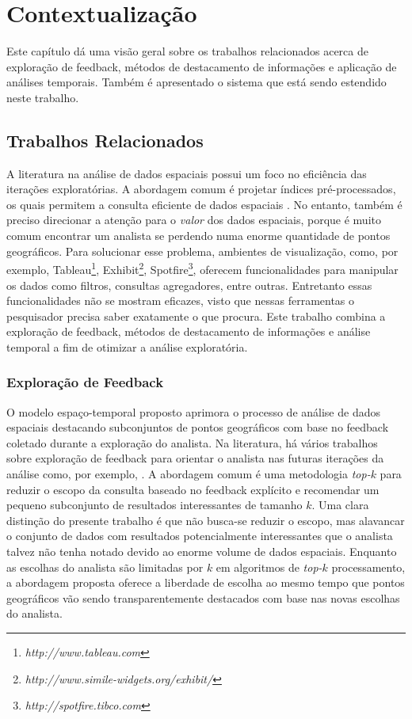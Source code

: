 \chapter{Contextualização}
\label{chap:contextualizacao}

Este capítulo dá uma visão geral sobre os trabalhos relacionados acerca de exploração de feedback, métodos de destacamento de informações e aplicação de análises temporais. Também é apresentado o sistema que está sendo estendido neste trabalho.

\section{Trabalhos Relacionados}

A literatura na análise de dados espaciais possui um foco no eficiência das iterações exploratórias. A abordagem comum é projetar índices pré-processados, os quais permitem a consulta eficiente de dados espaciais \cite{lins2013nanocubes}. No entanto, também é preciso direcionar a atenção para o {\em valor} dos dados espaciais, porque é muito comum encontrar um analista se perdendo numa enorme quantidade de pontos geográficos. Para solucionar esse problema, ambientes de visualização, como, por exemplo, Tableau\footnote{\it http://www.tableau.com}, Exhibit\footnote{\it http://www.simile-widgets.org/exhibit/}, Spotfire\footnote{\it  http://spotfire.tibco.com}, oferecem funcionalidades para manipular os dados como filtros, consultas agregadores, entre outras. Entretanto essas funcionalidades não se mostram eficazes, visto que nessas ferramentas o pesquisador precisa saber exatamente o que procura. Este trabalho combina a exploração de feedback, métodos de destacamento de informações e análise temporal a fim de otimizar a análise exploratória.

\subsection{Exploração de Feedback}

O modelo espaço-temporal proposto aprimora o processo de análise de dados espaciais destacando subconjuntos de pontos geográficos com base no feedback coletado durante a exploração do analista. Na literatura, há vários trabalhos sobre exploração de feedback para orientar o analista nas futuras iterações da análise como, por exemplo, . A abordagem comum é uma metodologia {\em top-$k$} para reduzir o escopo da consulta baseado no feedback explícito e recomendar um pequeno subconjunto de resultados interessantes de tamanho $k$. Uma clara distinção do presente trabalho é que não busca-se reduzir o escopo, mas alavancar o conjunto de dados com resultados potencialmente interessantes que o analista talvez não tenha notado devido ao enorme volume de dados espaciais. Enquanto as escolhas do analista são limitadas por $k$ em algoritmos de {\em top-$k$} processamento, a abordagem proposta oferece a liberdade de escolha ao mesmo tempo que pontos geográficos vão sendo transparentemente destacados com base nas novas escolhas do analista.

